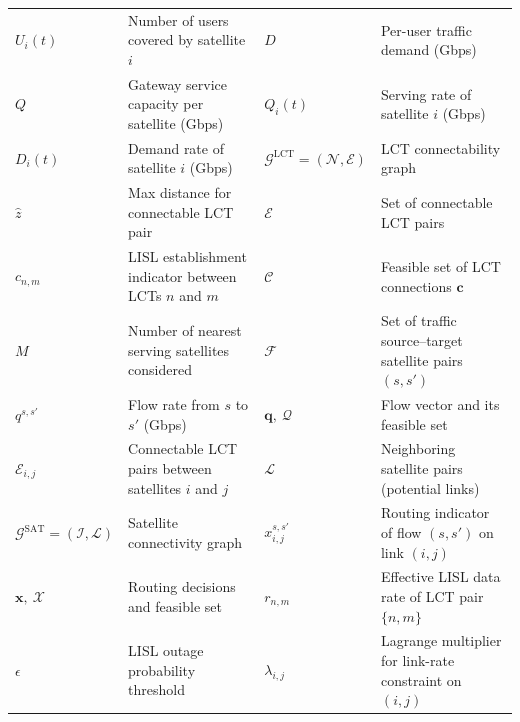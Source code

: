 \documentclass[journal]{IEEEtran}
\begin{document}
\begin{table}[t]
\begin{tabular}{@{}l p{} l p{}@{}}
    $U_i(t)$ & Number of users covered by satellite $i$ & $D$ & Per-user traffic demand (Gbps) \\

    $Q$ & Gateway service capacity per satellite (Gbps) & $Q_i(t)$ & Serving rate of satellite $i$ (Gbps) \\

    $D_i(t)$ & Demand rate of satellite $i$ (Gbps) & $\mathcal{G}^{\text{LCT}}=(\mathcal{N},\mathcal{E})$ & LCT connectability graph \\

    $\hat{z}$ & Max distance for connectable LCT pair & $\mathcal{E}$ & Set of connectable LCT pairs \\

    $c_{n,m}$ & LISL establishment indicator between LCTs $n$ and $m$ & $\mathcal{C}$ & Feasible set of LCT connections $\mathbf{c}$ \\

    $M$ & Number of nearest serving satellites considered & $\mathcal{F}$ & Set of traffic source--target satellite pairs $(s,s')$ \\

    $q^{s,s'}$ & Flow rate from $s$ to $s'$ (Gbps) & $\mathbf{q},\ \mathcal{Q}$ & Flow vector and its feasible set \\

    $\mathcal{E}_{i,j}$ & Connectable LCT pairs between satellites $i$ and $j$ & $\mathcal{L}$ & Neighboring satellite pairs (potential links) \\

    $\mathcal{G}^{\text{SAT}}=(\mathcal{I},\mathcal{L})$ & Satellite connectivity graph & $x^{s,s'}_{i,j}$ & Routing indicator of flow $(s,s')$ on link $(i,j)$ \\

    $\mathbf{x},\ \mathcal{X}$ & Routing decisions and feasible set & $r_{n,m}$ & Effective LISL data rate of LCT pair $\{n,m\}$ \\

    $\epsilon$ & LISL outage probability threshold & $\lambda_{i,j}$ & Lagrange multiplier for link-rate constraint on $(i,j)$ \\
    \hline
  \end{tabular}
  \vspace{-0.25cm}
\end{table}
\end{document}
